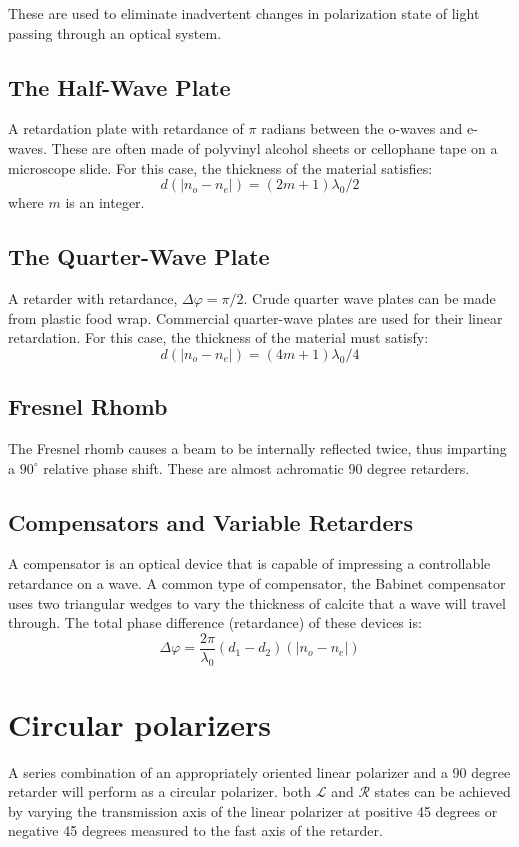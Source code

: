 \documentclass[12pt]{report}
\begin{document}
These are used to eliminate inadvertent changes in polarization state of light passing through an optical system.

\subsection{The Half-Wave Plate}
A retardation plate with retardance of $\pi$ radians between the o-waves and e-waves. These are often made of polyvinyl alcohol sheets or cellophane tape on a microscope slide. For this case, the thickness of the material satisfies:
\[ d(| n_o - n_e |) = (2m+1)\lambda_0 /2\]
where $m$ is an integer. 

\subsection{The Quarter-Wave Plate}
A retarder with retardance, $\Delta\varphi = \pi/2$. Crude quarter wave plates can be made from plastic food wrap. Commercial quarter-wave plates are used for their linear retardation. For this case, the thickness of the material must satisfy: 
\[ d(| n_o - n_e |) = (4m+1)\lambda_0 /4\]
\subsection{Fresnel Rhomb}
The Fresnel rhomb causes a beam to be internally reflected twice, thus imparting a $90^\circ$ relative phase shift. These are almost achromatic 90 degree retarders. 

\subsection{Compensators and Variable Retarders}
A compensator is an optical device that is capable of impressing a controllable retardance on a wave. A common type of compensator, the Babinet compensator uses two triangular wedges to vary the thickness of calcite that a wave will travel through. The total phase difference (retardance) of these devices is:
\[\Delta\varphi=\frac{2\pi}{\lambda_0}(d_1-d_2)(|n_o-n_e|)\]
\section{Circular polarizers}
A series combination of an appropriately oriented linear polarizer and a 90 degree retarder will perform as a circular polarizer. both $\mathcal{L}$ and $\mathcal{R}$ states can be achieved by varying the transmission axis of the linear polarizer at positive 45 degrees or negative 45 degrees measured to the fast axis of the retarder. 
\end{document}
